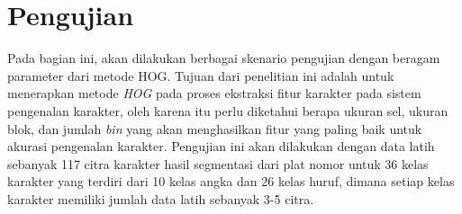 
\section{Pengujian}
\noindent Pada bagian ini, akan dilakukan berbagai skenario pengujian dengan beragam parameter dari metode HOG. Tujuan dari penelitian ini adalah untuk menerapkan metode \textit{HOG} pada proses ekstraksi fitur karakter pada sistem pengenalan karakter, oleh karena itu perlu diketahui berapa ukuran sel, ukuran blok, dan jumlah \textit{bin} yang akan menghasilkan fitur yang paling baik untuk akurasi pengenalan karakter. Pengujian ini akan dilakukan dengan data latih sebanyak 117 citra karakter hasil segmentasi dari plat nomor untuk 36 kelas karakter yang terdiri dari 10 kelas angka dan 26 kelas huruf, dimana setiap kelas karakter memiliki jumlah data latih sebanyak 3-5 citra.\\


